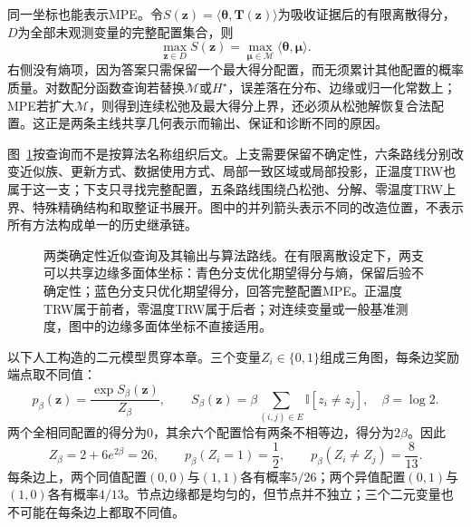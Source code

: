 同一坐标也能表示MPE。令$S(\bm z)=\langle\bm{\theta},\bm T(\bm z)\rangle$为吸收证据后的有限离散得分，$D$为全部未观测变量的完整配置集合，则
\begin{equation}
  \max_{\bm z\in D}S(\bm z)
    =\max_{\bm{\mu}\in\mathcal M}
       \langle\bm{\theta},\bm{\mu}\rangle.
  \label{eq:pgm-variational-mpe}
\end{equation}
右侧没有熵项，因为答案只需保留一个最大得分配置，而无须累计其他配置的概率质量。对数配分函数查询若替换$\mathcal M$或$H^\star$，误差落在分布、边缘或归一化常数上；MPE若扩大$\mathcal M$，则得到连续松弛及最大得分上界，还必须从松弛解恢复合法配置。这正是两条主线共享几何表示而输出、保证和诊断不同的原因。

图~\ref{fig:pgm-variational-query-map}按查询而不是按算法名称组织后文。上支需要保留不确定性，六条路线分别改变近似族、更新方式、数据使用方式、局部一致区域或局部投影，正温度TRW也属于这一支；下支只寻找完整配置，五条路线围绕凸松弛、分解、零温度TRW上界、特殊精确结构和取整证书展开。图中的并列箭头表示不同的改造位置，不表示所有方法构成单一的历史继承链。
\begin{figure}[htbp]
  \centering
  
  \caption{两类确定性近似查询及其输出与算法路线。在有限离散设定下，两支可以共享边缘多面体坐标：青色分支优化期望得分与熵，保留后验不确定性；蓝色分支只优化期望得分，回答完整配置MPE。正温度TRW属于前者，零温度TRW属于后者；对连续变量或一般基准测度，图中的边缘多面体坐标不直接适用。}
  \label{fig:pgm-variational-query-map}
\end{figure}

\begin{example}[三角图的精确基准]
  \label{ex:pgm-variational-triangle}
  以下人工构造的二元模型贯穿本章。三个变量$Z_i\in\{0,1\}$组成三角图，每条边奖励端点取不同值：
  \begin{equation}
    p_\beta(\bm{z})=\frac{\exp S_\beta(\bm{z})}{Z_\beta},
    \qquad
    S_\beta(\bm{z})
      =\beta\sum_{(i,j)\in E}\mathbb I[z_i\ne z_j],
    \quad \beta=\log2.
    \label{eq:pgm-variational-triangle}
  \end{equation}
  两个全相同配置的得分为$0$，其余六个配置恰有两条不相等边，得分为$2\beta$。因此
  \[
    Z_\beta=2+6e^{2\beta}=26,\qquad
    p_\beta(Z_i=1)=\frac12,\qquad
    p_\beta(Z_i\ne Z_j)=\frac{8}{13}.
  \]
  每条边上，两个同值配置$(0,0)$与$(1,1)$各有概率$5/26$；两个异值配置$(0,1)$与$(1,0)$各有概率$4/13$。节点边缘都是均匀的，但节点并不独立；三个二元变量也不可能在每条边上都取不同值。
\end{example}


